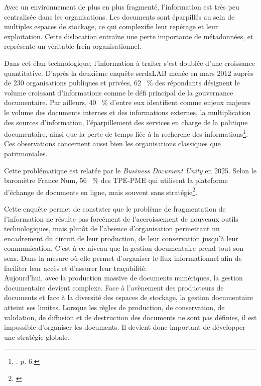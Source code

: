 Avec un environnement de plus en plus fragmenté, l’information est très peu centralisée dans les organisations. Les documents sont éparpillés au sein de multiples espaces de stockage, ce qui complexifie leur repérage et leur exploitation. Cette dislocation entraîne une perte importante de métadonnées, et représente un véritable frein organisationnel.

Dans cet élan technologique, l’information à traiter s’est doublée d’une croissance quantitative. D’après la deuxième enquête serdaLAB menée en mars 2012 auprès de 230 organisations publiques et privées, 62 ~\%  des répondants désignent le volume croissant d’informations comme le défi principal de la gouvernance documentaire. Par ailleurs, 40 ~\% d’entre eux identifient comme enjeux majeurs le volume des documents internes et des informations externes, la multiplication des sources d'information, l'éparpillement des services en charge de la politique documentaire, ainsi que la perte de temps liée à la recherche des informations\footnote{\cite{serdalab-gouvernance-2012}. p. 6.}. Ces observations concernent aussi bien les organisations classiques que patrimoniales.

Cette problématique est relatée par le \textit{Business Document Unity} en 2025. Selon le baromètre France Num, 56 ~\%  des TPE-PME qui utilisent la plateforme d’échange de documents en ligne, mais souvent sans stratégie\footnote{\cite{nexpubica-gestion-documentaire}}.

Cette enquête permet de constater que le problème de fragmentation de l’information ne résulte pas forcément de l’accroissement de nouveaux outils technologiques, mais plutôt de l’absence d’organisation permettant un encadrement du circuit de leur production, de leur conservation jusqu’à leur communication. C’est à ce niveau que la gestion documentaire prend tout son sens. Dans la mesure où elle permet d’organiser le flux informationnel afin de faciliter leur accès et d’assurer leur traçabilité.\\[0.1cm]

Aujourd’hui, avec la production massive de documents numériques, la gestion documentaire devient complexe. Face à l’avènement des producteurs de documents et face à la diversité des espaces de stockage, la gestion documentaire atteint ses limites. Lorsque les règles de production, de conservation, de validation, de diffusion et de destruction des documents ne sont pas définies, il est impossible d’organiser les documents. Il devient donc important de développer une stratégie globale.

